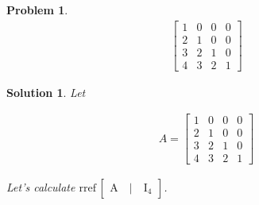 \documentclass{article}
\newtheorem{problem}{Problem}
\newtheorem*{solution}{Solution}
\newcommand{\rref}[1]{\mathrm{rref \, #1}}
\begin{document}
\begin{problem}
\begin{align*}
\begin{bmatrix}
1 & 0 & 0 & 0 \\
2 & 1 & 0 & 0 \\
3 & 2 & 1 & 0 \\
4 & 3 & 2 & 1
\end{bmatrix}
\end{align*}
\end{problem}

\begin{solution}
Let 

\begin{align*}
A = \begin{bmatrix}
1 & 0 & 0 & 0 \\
2 & 1 & 0 & 0 \\
3 & 2 & 1 & 0 \\
4 & 3 & 2 & 1
\end{bmatrix}
\end{align*}

Let's calculate $\rref{\begin{bmatrix} A \quad \vert \quad I_{4} \end{bmatrix}}$.


\end{solution}
\end{document}
